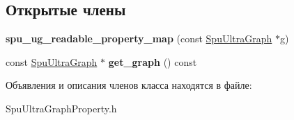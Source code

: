 \subsection*{Открытые члены}
\begin{DoxyCompactItemize}
\item 
\mbox{\label{classboost_1_1spu__ug__readable__property__map_a67b585ee618ecf40930460ba4e03cb0d}} 
{\bfseries spu\+\_\+ug\+\_\+readable\+\_\+property\+\_\+map} (const \hyperlink{class_s_p_u___g_r_a_p_h_1_1_spu_ultra_graph}{Spu\+Ultra\+Graph} $\ast$g)
\item 
\mbox{\label{classboost_1_1spu__ug__readable__property__map_a70019f5e3f097b0fc469235476fa18d3}} 
const \hyperlink{class_s_p_u___g_r_a_p_h_1_1_spu_ultra_graph}{Spu\+Ultra\+Graph} $\ast$ {\bfseries get\+\_\+graph} () const
\end{DoxyCompactItemize}


Объявления и описания членов класса находятся в файле\+:\begin{DoxyCompactItemize}
\item 
Spu\+Ultra\+Graph\+Property.\+h\end{DoxyCompactItemize}
